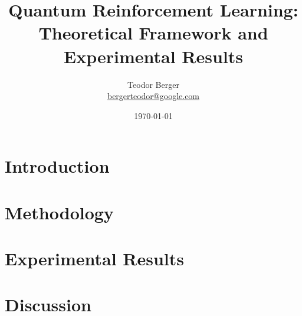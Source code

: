 \documentclass[11pt]{quantumpaper}
\title{Quantum Reinforcement Learning:\\ Theoretical Framework and Experimental Results}
\author{Teodor Berger\\ \small{\href{mailto:bergerteodor@google.com}{bergerteodor@google.com}}}
\date{\today}
\begin{document}
\maketitle

\begin{abstract}
    
\end{abstract}

\section{Introduction}
\label{sec:intro}


\section{Methodology}
\label{sec:method}


\section{Experimental Results}
\label{sec:results}


\section{Discussion}
\label{sec:discuss}




\end{document}
